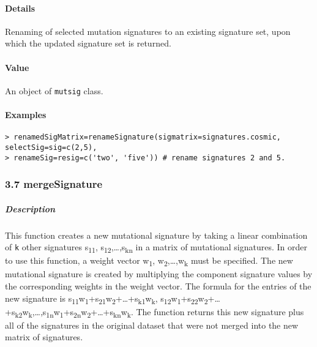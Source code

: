 \documentclass[]{article}
\let\oldparagraph\paragraph
\renewcommand{\paragraph}[1]{\oldparagraph{#1}\mbox{}}
\let\oldsubparagraph\subparagraph
\renewcommand{\subparagraph}[1]{\oldsubparagraph{#1}\mbox{}}
\begin{document}
\paragraph{\texorpdfstring{\textbf{Details}}{Details}}\label{details-4}

Renaming of selected mutation signatures to an existing signature set,
upon which the updated signature set is returned.

\paragraph{\texorpdfstring{\textbf{Value}}{Value}}\label{value-3}

An object of \texttt{mutsig} class.

\paragraph{\texorpdfstring{\textbf{Examples}}{Examples}}\label{examples-5}

\begin{verbatim}
> renamedSigMatrix=renameSignature(sigmatrix=signatures.cosmic, selectSig=sig=c(2,5), 
> renameSig=resig=c('two', 'five')) # rename signatures 2 and 5.
\end{verbatim}

\subsubsection{3.7 mergeSignature}\label{mergesignature}

\subparagraph{\texorpdfstring{\textbf{Description}}{Description}}\label{description-6}

This function creates a new mutational signature by taking a linear
combination of \texttt{k} other signatures s\textsubscript{11},
s\textsubscript{12},\ldots{},s\textsubscript{kn} in a matrix of
mutational signatures. In order to use this function, a weight vector
w\textsubscript{1}, w\textsubscript{2},\ldots{},w\textsubscript{k} must
be specified. The new mutational signature is created by multiplying the
component signature values by the corresponding weights in the weight
vector. The formula for the entries of the new signature is
s\textsubscript{11}w\textsubscript{1}+s\textsubscript{21}w\textsubscript{2}+\ldots{}+s\textsubscript{k1}w\textsubscript{k},
s\textsubscript{12}w\textsubscript{1}+s\textsubscript{22}w\textsubscript{2}+\ldots{}+s\textsubscript{k2}w\textsubscript{k},\ldots{},s\textsubscript{1n}w\textsubscript{1}+s\textsubscript{2n}w\textsubscript{2}+\ldots{}+s\textsubscript{kn}w\textsubscript{k}.
The function returns this new signature plus all of the signatures in
the original dataset that were not merged into the new matrix of
signatures.
\end{document}
